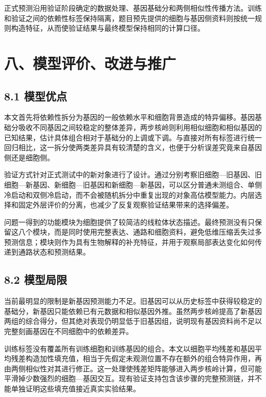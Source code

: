 正式预测沿用验证阶段确定的数据处理、基因基础分和两侧相似性传播方法。训练和验证之间的依赖性标签保持隔离，题目预先提供的细胞与基因侧资料则按统一规则构造特征，从而使验证结果与最终模型保持相同的计算口径。

\hypertarget{ux516bux6a21ux578bux8bc4ux4ef7ux6539ux8fdbux4e0eux63a8ux5e7f}{%
\section{八、模型评价、改进与推广}\label{ux516bux6a21ux578bux8bc4ux4ef7ux6539ux8fdbux4e0eux63a8ux5e7f}}

\hypertarget{81-ux6a21ux578bux4f18ux70b9}{%
\subsection{8.1 模型优点}\label{81-ux6a21ux578bux4f18ux70b9}}

本文首先将依赖性拆分为基因的一般依赖水平和细胞背景造成的特异偏移。基因基础分吸收不同基因之间较稳定的整体差异，两步核岭则利用相似细胞和相似基因的已知结果，估计具体组合相对于基础分的上调或下调。与直接对所有标签进行统一回归相比，这一拆分使两类差异具有较清楚的含义，也便于分析误差究竟来自基因侧还是细胞侧。

验证方式针对正式测试中的新对象进行了设计。通过分别考察旧细胞---旧基因、旧细胞---新基因、新细胞---旧基因和新细胞---新基因，可以区分普通未测组合、单侧冷启动和双侧冷启动，而不会被随机拆分中重复出现的对象高估模型能力。内层选择和固定外层评价的分离，也减少了反复观察验证结果带来的选择偏差。

问题一得到的功能模块为细胞提供了较简洁的线粒体状态描述。最终预测没有只保留这八个模块，而是同时使用完整表达、通路和细胞资料，避免低维压缩丢失过多预测信息；模块则作为具有生物解释的补充特征，并用于观察局部表达变化如何传递到通路状态和预测结果。

\hypertarget{82-ux6a21ux578bux5c40ux9650}{%
\subsection{8.2 模型局限}\label{82-ux6a21ux578bux5c40ux9650}}

当前最明显的限制是新基因预测能力不足。旧基因可以从历史标签中获得较稳定的基础分，新基因只能依赖已有元数据和相似基因外推。虽然两步核岭提高了新基因两组的综合得分，但其绝对表现仍明显低于旧基因组，说明现有基因资料尚不足以完整刻画基因在不同细胞中的依赖差异。

训练标签没有覆盖所有训练细胞和训练基因的组合。本文以细胞平均残差和基因平均残差构造加性填充值，相当于先假定未观测位置不存在额外的组合特异作用，再由两侧相似性对其进行修正。这一处理使残差矩阵能够进入两步核岭计算，但可能平滑掉少数强烈的细胞---基因交互。现有验证支持包含该步骤的完整预测链，并不能单独证明这些填充值接近真实实验结果。

